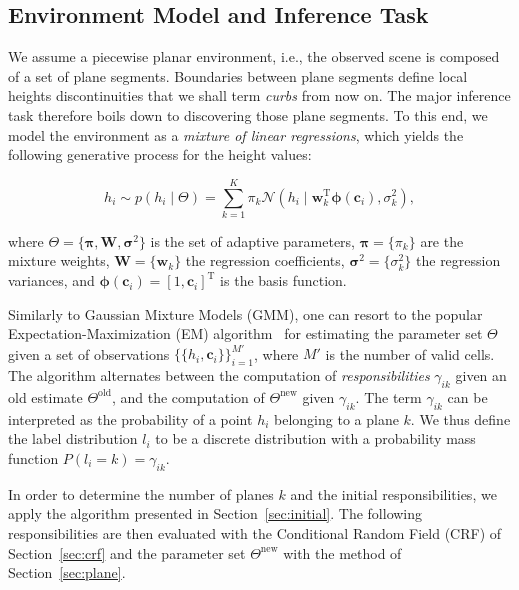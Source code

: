 \subsection{Environment Model and Inference Task}
We assume a piecewise planar environment, i.e., the observed scene is composed
of a set of plane segments. Boundaries between plane segments define local
heights discontinuities that we shall term \emph{curbs} from now on. The major
inference task therefore boils down to discovering those plane segments. To this
end, we model the environment as a \emph{mixture of linear regressions}, which
yields the following generative process for the height values:

\begin{equation}
\label{eqn:mixture}
h_i\sim p(h_i\mid\Theta)=\sum_{k=1}^K\pi_k\mathcal{N}(h_i\mid
\mathbf{w}_k^\text{T}\boldsymbol{\phi}(\mathbf{c}_i),\sigma^2_k),
\end{equation}

where $\Theta=\{\boldsymbol{\pi},\mathbf{W},\boldsymbol{\sigma}^2\}$ is the set
of adaptive parameters, $\boldsymbol{\pi}=\{\pi_k\}$ are the mixture weights,
$\mathbf{W}=\{\mathbf{w}_k\}$ the regression coefficients,
$\boldsymbol{\sigma}^2=\{\sigma^2_k\}$ the regression variances, and
$\boldsymbol{\phi}(\mathbf{c}_i)=[1,\mathbf{c}_i]^\text{T}$ is the basis
function.

Similarly to Gaussian Mixture Models (GMM), one can resort to the popular
Expectation-Maximization (EM) algorithm~\cite{dempster77maximum} for estimating
the parameter set $\Theta$ given a set of observations
$\{\{h_i,\mathbf{c}_i\}\}_{i=1}^{M'}$, where $M'$ is the number of valid cells.
The algorithm alternates between the computation of \emph{responsibilities}
$\gamma_{ik}$ given an old estimate $\Theta^\text{old}$, and the computation of
$\Theta^\text{new}$ given $\gamma_{ik}$. The term $\gamma_{ik}$ can be
interpreted as the probability of a point $h_i$ belonging to a plane $k$. We
thus define the label distribution $l_i$ to be a discrete distribution with a
probability mass function $P(l_i=k)=\gamma_{ik}$.

In order to determine the number of planes $k$ and the initial responsibilities,
we apply the algorithm presented in Section~\ref{sec:initial}. The following
responsibilities are then evaluated with the Conditional Random Field (CRF) of
Section~\ref{sec:crf} and the parameter set $\Theta^\text{new}$ with the method
of Section~\ref{sec:plane}.
